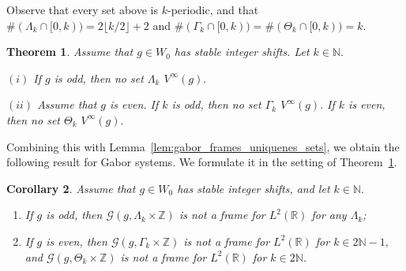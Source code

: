 \documentclass[12pt]{amsart}
\numberwithin{equation}{section}
\newtheorem{theorem}{Theorem}[section]
\newtheorem{corollary}[theorem]{Corollary} \newcommand{\La}{\Lambda}
\newcommand{\R}{{\mathbb R}} \newcommand{\Q}{{\mathbb Q}} \newcommand{\Z}{{\mathbb Z}} \newcommand{\N}{{\mathbb N}}
\begin{document}
Observe that every set above is $k$-periodic, and that $\#(\Lambda_k\cap [0,k))=2 \lfloor k/2 \rfloor+2$ and $\#(\Gamma_k\cap [0,k))= \#(\Theta_k\cap [0,k))=k$.

\begin{theorem}\label{non_uniq_approx_lattice}
  Assume that $g\in W_0$ has stable integer shifts.
  Let $ k\in \N.$
  
$(i)$ If $g$ is odd, then no set $\Lambda_k$    $V^{\infty}(g).$
      
$(ii)$ Assume that $g$ is even. If $k$ is odd, then  no set $\Gamma_k$    $V^{\infty}(g).$ 
      If $k$ is even, then  no set $\Theta_k$    $V^{\infty}(g).$

\end{theorem}

Combining this with Lemma~\ref{lem:gabor_frames_uniquenes_sets}, we obtain the following result for Gabor systems. We formulate it in the setting of Theorem~\ref{non_uniq_approx_lattice}.
\begin{corollary}\label{cor:Gabor_even_odd}Assume that $g\in W_0$ has stable integer shifts, and let $k\in \N.$
\begin{enumerate}
    \item[(i)] If $g$ is odd, then  $\mathcal{G}(g, \Lambda_k\times\Z)$ is not a frame for $L^2(\R)$ for any $\Lambda_k$;    
    \item[(ii)]  If $g$ is even, then  $\mathcal{G}(g, \Gamma_k\times\Z)$ is not a frame for $L^2(\R)$ for $ k \in 2\N-1,$ and $\mathcal{G}(g, \Theta_k\times\Z)$ is not a frame for $L^2(\R)$ for $ k \in 2\N$.
\end{enumerate}
\end{corollary}
\end{document}
